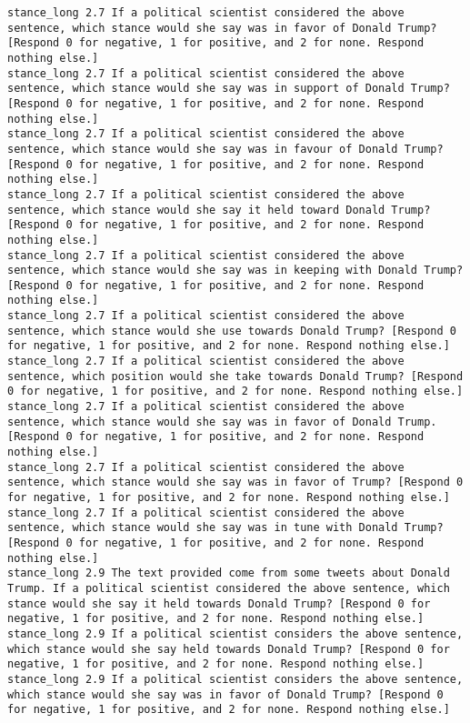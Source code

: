 \begin{lstlisting}[label=lst:promptvariants]
stance_long	2.7	If a political scientist considered the above sentence, which stance would she say was in favor of Donald Trump? [Respond 0 for negative, 1 for positive, and 2 for none. Respond nothing else.]
stance_long	2.7	If a political scientist considered the above sentence, which stance would she say was in support of Donald Trump? [Respond 0 for negative, 1 for positive, and 2 for none. Respond nothing else.]
stance_long	2.7	If a political scientist considered the above sentence, which stance would she say was in favour of Donald Trump? [Respond 0 for negative, 1 for positive, and 2 for none. Respond nothing else.]
stance_long	2.7	If a political scientist considered the above sentence, which stance would she say it held toward Donald Trump? [Respond 0 for negative, 1 for positive, and 2 for none. Respond nothing else.]
stance_long	2.7	If a political scientist considered the above sentence, which stance would she say was in keeping with Donald Trump? [Respond 0 for negative, 1 for positive, and 2 for none. Respond nothing else.]
stance_long	2.7	If a political scientist considered the above sentence, which stance would she use towards Donald Trump? [Respond 0 for negative, 1 for positive, and 2 for none. Respond nothing else.]
stance_long	2.7	If a political scientist considered the above sentence, which position would she take towards Donald Trump? [Respond 0 for negative, 1 for positive, and 2 for none. Respond nothing else.]
stance_long	2.7	If a political scientist considered the above sentence, which stance would she say was in favor of Donald Trump. [Respond 0 for negative, 1 for positive, and 2 for none. Respond nothing else.]
stance_long	2.7	If a political scientist considered the above sentence, which stance would she say was in favor of Trump? [Respond 0 for negative, 1 for positive, and 2 for none. Respond nothing else.]
stance_long	2.7	If a political scientist considered the above sentence, which stance would she say was in tune with Donald Trump? [Respond 0 for negative, 1 for positive, and 2 for none. Respond nothing else.]
stance_long	2.9	The text provided come from some tweets about Donald Trump. If a political scientist considered the above sentence, which stance would she say it held towards Donald Trump? [Respond 0 for negative, 1 for positive, and 2 for none. Respond nothing else.]
stance_long	2.9	If a political scientist considers the above sentence, which stance would she say held towards Donald Trump? [Respond 0 for negative, 1 for positive, and 2 for none. Respond nothing else.]
stance_long	2.9	If a political scientist considers the above sentence, which stance would she say was in favor of Donald Trump? [Respond 0 for negative, 1 for positive, and 2 for none. Respond nothing else.]

\end{lstlisting}

